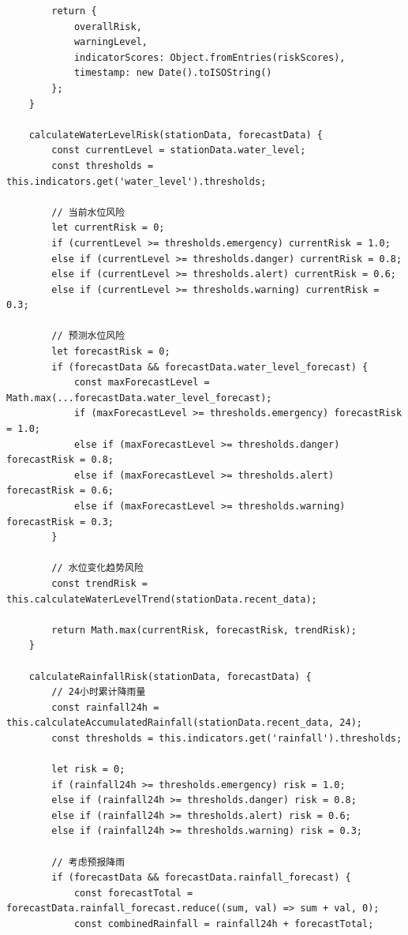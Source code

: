 \begin{lstlisting}
        return {
            overallRisk,
            warningLevel,
            indicatorScores: Object.fromEntries(riskScores),
            timestamp: new Date().toISOString()
        };
    }
    
    calculateWaterLevelRisk(stationData, forecastData) {
        const currentLevel = stationData.water_level;
        const thresholds = this.indicators.get('water_level').thresholds;
        
        // 当前水位风险
        let currentRisk = 0;
        if (currentLevel >= thresholds.emergency) currentRisk = 1.0;
        else if (currentLevel >= thresholds.danger) currentRisk = 0.8;
        else if (currentLevel >= thresholds.alert) currentRisk = 0.6;
        else if (currentLevel >= thresholds.warning) currentRisk = 0.3;
        
        // 预测水位风险
        let forecastRisk = 0;
        if (forecastData && forecastData.water_level_forecast) {
            const maxForecastLevel = Math.max(...forecastData.water_level_forecast);
            if (maxForecastLevel >= thresholds.emergency) forecastRisk = 1.0;
            else if (maxForecastLevel >= thresholds.danger) forecastRisk = 0.8;
            else if (maxForecastLevel >= thresholds.alert) forecastRisk = 0.6;
            else if (maxForecastLevel >= thresholds.warning) forecastRisk = 0.3;
        }
        
        // 水位变化趋势风险
        const trendRisk = this.calculateWaterLevelTrend(stationData.recent_data);
        
        return Math.max(currentRisk, forecastRisk, trendRisk);
    }
    
    calculateRainfallRisk(stationData, forecastData) {
        // 24小时累计降雨量
        const rainfall24h = this.calculateAccumulatedRainfall(stationData.recent_data, 24);
        const thresholds = this.indicators.get('rainfall').thresholds;
        
        let risk = 0;
        if (rainfall24h >= thresholds.emergency) risk = 1.0;
        else if (rainfall24h >= thresholds.danger) risk = 0.8;
        else if (rainfall24h >= thresholds.alert) risk = 0.6;
        else if (rainfall24h >= thresholds.warning) risk = 0.3;
        
        // 考虑预报降雨
        if (forecastData && forecastData.rainfall_forecast) {
            const forecastTotal = forecastData.rainfall_forecast.reduce((sum, val) => sum + val, 0);
            const combinedRainfall = rainfall24h + forecastTotal;
            

\end{lstlisting}
